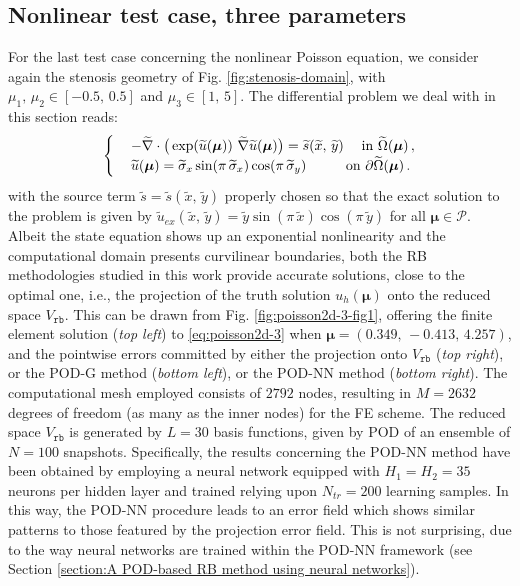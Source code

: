 \documentclass[12pt, a4paper, twoside, openright, notitlepage]{report}
\numberwithin{equation}{chapter}
\theoremstyle{theorem}
\theoremstyle{definition}
\theoremstyle{remark}
\theoremstyle{proposition}
\numberwithin{figure}{chapter}
\newcommand{\wt}[1]{\widetilde{#1}}
\newcommand{\bg}[1]{\boldsymbol{#1}}
\begin{document}
	\subsection{Nonlinear test case, three parameters}
	\label{section:poisson2d-3}
	
		For the last test case concerning the nonlinear Poisson equation, we consider again the stenosis geometry of Fig. \ref{fig:stenosis-domain}, with $\mu_1, \, \mu_2 \in [-0.5, \, 0.5]$ and $\mu_3 \in [1, \, 5]$. The differential problem we deal with in this section reads:
		\begin{equation}
			\label{eq:poisson2d-3}
			\begin{cases}
				& - \wt{\nabla} \cdot \big( \exp(\wt{u}(\bg{\mu})) ~ \wt{\nabla} \wt{u}(\bg{\mu}) \big) = \wt{s}(\wt{x}, \, \wt{y}) \hspace*{0.45cm} \text{in $\wt{\Omega}(\bg{\mu})$} \, , \\
				& \wt{u}(\bg{\mu}) = \wt{\sigma}_x \sin(\pi \, \wt{\sigma}_x) \cos(\pi \, \wt{\sigma}_y) \hspace*{1.0cm} \text{on $\partial \wt{\Omega}(\bg{\mu})$} \, .
			\end{cases}
		\end{equation}
		with the source term $\wt{s} = \wt{s}(\wt{x}, \, \wt{y})$ properly chosen so that the exact solution to the problem is given by $\wt{u}_{ex}(\wt{x}, \, \wt{y}) = \wt{y} \sin(\pi \, \wt{x}) \cos(\pi \, \wt{y})$ for all $\bg{\mu} \in \mathcal{P}$. Albeit the state equation shows up an exponential nonlinearity and the computational domain presents curvilinear boundaries, both the RB methodologies studied in this work provide accurate solutions, close to the optimal one, i.e., the projection of the truth solution $u_h(\bg{\mu})$ onto the reduced space $V_{\texttt{rb}}$. This can be drawn from Fig. \ref{fig:poisson2d-3-fig1}, offering the finite element solution (\emph{top left}) to \eqref{eq:poisson2d-3} when $\bg{\mu} = (0.349, \, -0.413, \, 4.257)$, and the pointwise errors committed by either the projection onto $V_{\texttt{rb}}$ (\emph{top right}), or the POD-G method (\emph{bottom left}), or the POD-NN method (\emph{bottom right}). The computational mesh employed consists of $2792$ nodes, resulting in $M = 2632$ degrees of freedom (as many as the inner nodes) for the FE scheme. The reduced space $V_{\texttt{rb}}$ is generated by $L = 30$ basis functions, given by POD of an ensemble of $N = 100$ snapshots. Specifically, the results concerning the POD-NN method have been obtained by employing a neural network equipped with $H_1 = H_2 = 35$ neurons per hidden layer and trained relying upon $N_{tr} = 200$ learning samples. In this way, the POD-NN procedure leads to an error field which shows similar patterns to those featured by the projection error field. This is not surprising, due to the way neural networks are trained within the POD-NN framework (see Section \ref{section:A POD-based RB method using neural networks}). 
				
\end{document}
